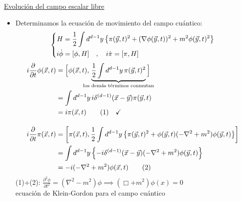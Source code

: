 \vspace{0.5cm}
\noindent \underline{Evolución del campo escalar libre}
\begin{itemize}
    \item Determinamos la ecuación de movimiento del campo cuántico:
          \[
              \left\{
              \begin{aligned}
                  H            & = \frac{1}{2} \int d^{d-1}y \left\{ \pi(\vec{y},t)^2 + (\nabla \phi(\vec{y},t))^2 + m^2 \phi(\vec{y},t)^2 \right\} \\
                  i \dot{\phi} & = \comm{\phi}{H} \quad , \quad i \dot{\pi} = \comm{\pi}{H}
              \end{aligned}
              \right.
          \]
          \begin{align*}
              i \frac{\partial}{\partial t} \phi(\vec{x},t)
               & = \Big[ \phi(\vec{x},t), \, \underbrace{\frac{1}{2} \int d^{d-1}y \, \pi(\vec{y},t)^2}_{\mathclap{\text{los demás términos conmutan}}} \Big] \\
               & = \int d^{d-1}y \, i \delta^{(d-1)}(\vec{x}-\vec{y}) \pi(\vec{y},t)                                                                          \\
               & = i \pi(\vec{x},t) \tag{1} \quad \checkmark
              \\[1em]
              i \frac{\partial}{\partial t} \pi(\vec{x},t)
               & = \comm{\pi(\vec{x},t)}{\frac{1}{2} \int d^{d-1}y \left\{ \pi(\vec{y},t)^2 + \phi(\vec{y},t)(-\nabla^2 + m^2)\phi(\vec{y},t) \right\}}       \\
               & = \int d^{d-1}y \left\{ -i \delta^{(d-1)}(\vec{x}-\vec{y}) (-\nabla^2 + m^2)\phi(\vec{y},t) \right\}                                         \\
               & = -i (-\nabla^2 + m^2)\phi(\vec{x},t) \tag{2}
          \end{align*}
          (1)+(2): $\frac{\partial^2 \phi}{\partial t^2} = (\nabla^2 - m^2)\phi \implies (\Box + m^2)\phi(x) = 0$ \\
          ecuación de Klein-Gordon para el campo cuántico \checkmark
\end{itemize}

